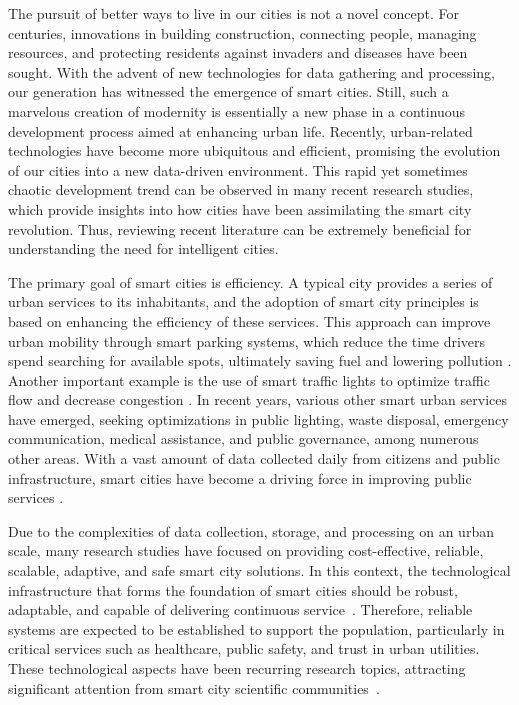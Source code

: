 \documentclass[smartcities,article,submit,pdftex,moreauthors]{Definitions/mdpi}
\begin{document}
The pursuit of better ways to live in our cities is not a novel concept. For centuries, innovations in building construction, connecting people, managing resources, and protecting residents against invaders and diseases have been sought. With the advent of new technologies for data gathering and processing, our generation has witnessed the emergence of smart cities. Still, such a marvelous creation of modernity is essentially a new phase in a continuous development process aimed at enhancing urban life. Recently, urban-related technologies have become more ubiquitous and efficient, promising the evolution of our cities into a new data-driven environment. This rapid yet sometimes chaotic development trend can be observed in many recent research studies, which provide insights into how cities have been assimilating the smart city revolution. Thus, reviewing recent literature can be extremely beneficial for understanding the need for intelligent cities.

The primary goal of smart cities is efficiency. A typical city provides a series of urban services to its inhabitants, and the adoption of smart city principles is based on enhancing the efficiency of these services. This approach can improve urban mobility through smart parking systems, which reduce the time drivers spend searching for available spots, ultimately saving fuel and lowering pollution \cite{smartparking}. Another important example is the use of smart traffic lights to optimize traffic flow and decrease congestion \cite{smartlights}. In recent years, various other smart urban services have emerged, seeking optimizations in public lighting, waste disposal, emergency communication, medical assistance, and public governance, among numerous other areas. With a vast amount of data collected daily from citizens and public infrastructure, smart cities have become a driving force in improving public services \cite{surveySC1,surveySC2}.

Due to the complexities of data collection, storage, and processing on an urban scale, many research studies have focused on providing cost-effective, reliable, scalable, adaptive, and safe smart city solutions. In this context, the technological infrastructure that forms the foundation of smart cities should be robust, adaptable, and capable of delivering continuous service~\cite{kirimtatFutureTrendsCurrent2020,bittencourtSurveyAdaptiveSmart2024}. Therefore, reliable systems are expected to be established to support the population, particularly in critical services such as healthcare, public safety, and trust in urban utilities. These technological aspects have been recurring research topics, attracting significant attention from smart city scientific communities~\cite{surveySC3,surveySC4}.  
\end{document}
